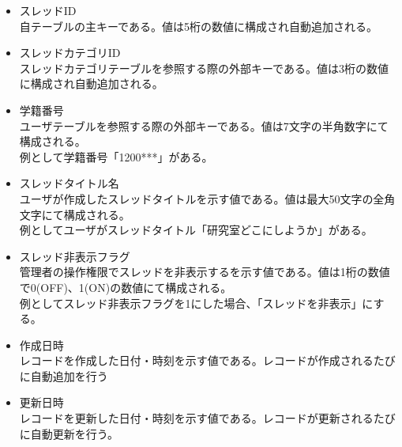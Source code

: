 \documentclass[a4j]{jarticle}
\begin{document}
  \begin{itemize}
  \item スレッドID\\
    自テーブルの主キーである。値は5桁の数値に構成され自動追加される。\\
   \item スレッドカテゴリID\\
    スレッドカテゴリテーブルを参照する際の外部キーである。値は3桁の数値に構成され自動追加される。\\

  \item 学籍番号\\
    ユーザテーブルを参照する際の外部キーである。値は7文字の半角数字にて構成される。\\
    例として学籍番号「1200***」がある。
  \item スレッドタイトル名\\
    ユーザが作成したスレッドタイトルを示す値である。値は最大50文字の全角文字にて構成される。\\例としてユーザがスレッドタイトル「研究室どこにしようか」がある。
  \item スレッド非表示フラグ\\
    管理者の操作権限でスレッドを非表示するを示す値である。値は1桁の数値で0(OFF)、1(ON)の数値にて構成される。\\
    例としてスレッド非表示フラグを1にした場合、「スレッドを非表示」にする。
  \item 作成日時\\
    レコードを作成した日付・時刻を示す値である。レコードが作成されるたびに自動追加を行う
  \item 更新日時\\
    レコードを更新した日付・時刻を示す値である。レコードが更新されるたびに自動更新を行う。
  \end{itemize}
\end{document}
